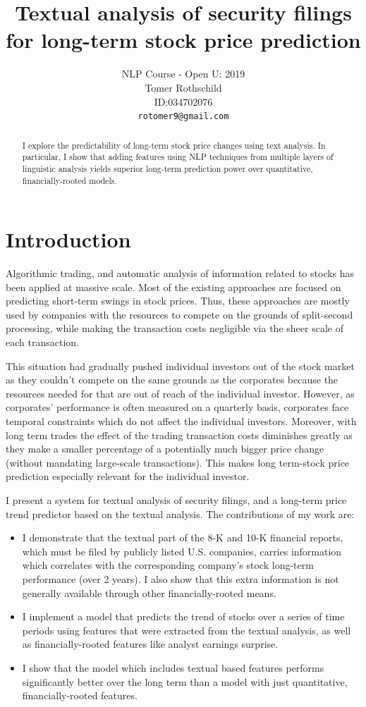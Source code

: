 \documentclass[11pt,a4paper]{article}
\title{Textual analysis of security filings for long-term stock price prediction }
\author{ NLP Course - Open U: 2019 \\
  Tomer Rothschild \\
  ID:034702076 \\
  \texttt{rotomer9@gmail.com} }
\date{}
\begin{document}
\maketitle
\begin{abstract}
  I explore the predictability of long-term stock price changes using text analysis. In particular, I show that adding features using NLP techniques from multiple layers of linguistic analysis yields superior long-term prediction power over quantitative, financially-rooted models.
\end{abstract}

\section{Introduction}
Algorithmic trading, and automatic analysis of information related to stocks has been applied at massive scale. Most of the existing approaches are focused on predicting short-term swings in stock prices. Thus, these approaches are mostly used by companies with the resources to compete on the grounds of split-second processing, while making the transaction costs negligible via the sheer scale of each transaction.

This situation had gradually pushed individual investors out of the stock market as they couldn't compete on the same grounds as the corporates because the resources needed for that are out of reach of the individual investor. However, as corporates' performance is often measured on a quarterly basis, corporates face temporal constraints which do not affect the individual investors. Moreover, with long term trades the effect of the trading transaction costs diminishes greatly as they make a smaller percentage of a potentially much bigger price change (without mandating large-scale transactions). This makes long term-stock price prediction especially relevant for the individual investor.

I present a system for textual analysis of security filings, and a long-term price trend predictor based on the textual analysis. The contributions of my work are:
\begin{itemize}
  \item I demonstrate that the textual part of the 8-K and 10-K financial reports, which must be filed by publicly listed U.S. companies, carries information which correlates with the corresponding company's stock long-term performance (over 2 years). I also show that this extra information is not generally available through other financially-rooted means.
  \item I implement a model that predicts the trend of stocks over a series of time periods using features that were extracted from the textual analysis, as well as financially-rooted features like analyst earnings surprise.
  \item I show that the model which includes textual based features performs significantly better over the long term than a model with just quantitative, financially-rooted features.
\end{itemize}
 
\end{document}
